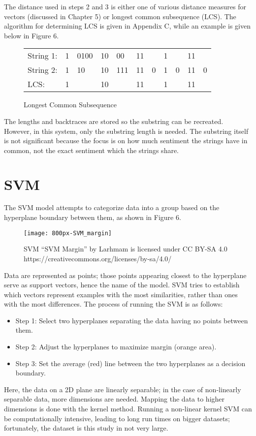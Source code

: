 \documentclass [11pt, proquest] {uwthesis}[2020/02/24]
\begin{document}
The distance used in steps 2 and 3 is either one of various distance measures for vectors (discussed in Chapter 5) or longest common subsequence (LCS). The algorithm for determining LCS is given in Appendix C, while an example is given below in Figure 6.
\begin{figure}[hbt!]
\centering
\begin{tabular}{ p{1.75cm}p{0.5cm}p{1cm}p{0.5cm}p{1cm}p{1cm}p{0.5cm}p{0.5cm}p{0.5cm}p{0.5cm}p{0.5cm} }
 \hline
 String 1:&1&0100&10&00&11&&1&&11&\\
 String 2:&1&10&10&111&11&0&1&0&11&0\\
 LCS:&1&&10&&11&&1&&11&\\
 \hline
\end{tabular}
\caption{Longest Common Subsequence}
\end{figure}
The lengths and backtraces are stored so the substring can be recreated. However, in this system, only the substring length is needed. The substring itself is not significant because the focus is on how much sentiment the strings have in common, not the exact sentiment which the strings share.

\section{SVM}
The SVM model attempts to categorize data into a group based on the hyperplane boundary between them, as shown in Figure 6.
\begin{figure}[hbt!]
\begin{center}
\texttt{[image: 800px-SVM\_margin]}
\end{center}
\caption{SVM ``SVM Margin'' by Larhmam is licensed under CC BY-SA 4.0 https://creativecommons.org/licenses/by-sa/4.0/}
\end{figure}
Data are represented as points; those points appearing closest to the hyperplane serve as support vectors, hence the name of the model. SVM tries to establish which vectors represent examples with the most similarities, rather than ones with the most differences. The process of running the SVM is as follows:
\begin{itemize}
\item Step 1: Select two hyperplanes separating the data having no points between them.
\item Step 2: Adjust the hyperplanes to maximize margin (orange area). 
\item Step 3: Set the average (red) line between the two hyperplanes as a decision boundary.
\end{itemize}
Here, the data on a 2D plane are linearly separable; in the case of non-linearly separable data, more dimensions are needed. Mapping the data to higher dimensions is done with the kernel method. Running a non-linear kernel SVM can be computationally intensive, leading to long run times on bigger datasets; fortunately, the dataset is this study in not very large.
\end{document}
